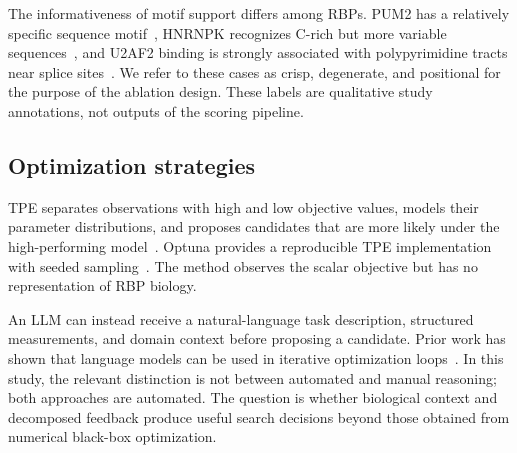The informativeness of motif support differs among RBPs. PUM2 has a relatively
specific sequence motif~\parencite{galgano2008}, HNRNPK recognizes C-rich but more
variable sequences~\parencite{thisted2001}, and U2AF2 binding is strongly associated
with polypyrimidine tracts near splice sites~\parencite{sickmier2006}. We refer to these cases as crisp, degenerate, and positional for the
purpose of the ablation design. These labels are qualitative study annotations,
not outputs of the scoring pipeline.

\subsection{Optimization strategies}

TPE separates observations with high and low objective values, models their
parameter distributions, and proposes candidates that are more likely under the
high-performing model~\parencite{bergstra2011}. Optuna provides a reproducible TPE
implementation with seeded sampling~\parencite{akiba2019}. The method observes the
scalar objective but has no representation of RBP biology.

An LLM can instead receive a natural-language task description, structured
measurements, and domain context before proposing a candidate. Prior work has
shown that language models can be used in iterative optimization
loops~\parencite{yang2023opro}. In this study, the relevant distinction is not
between automated and manual reasoning; both approaches are automated. The
question is whether biological context and decomposed feedback produce useful
search decisions beyond those obtained from numerical black-box optimization.
